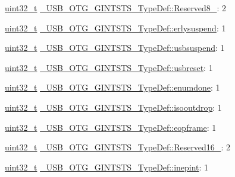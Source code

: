 \begin{DoxyCompactItemize}
\item 
\hyperlink{stdint_8h_a435d1572bf3f880d55459d9805097f62}{uint32\-\_\-t} \hyperlink{group___u_s_b___o_t_g___d_r_i_v_e_r_gac282811c049c2f0186941c0813ffb4bb}{\-\_\-\-U\-S\-B\-\_\-\-O\-T\-G\-\_\-\-G\-I\-N\-T\-S\-T\-S\-\_\-\-Type\-Def\-::\-Reserved8\-\_}\-: 2
\item 
\hyperlink{stdint_8h_a435d1572bf3f880d55459d9805097f62}{uint32\-\_\-t} \hyperlink{group___u_s_b___o_t_g___d_r_i_v_e_r_gaa2d6edb7543a04dc301dfe99d40fdaa0}{\-\_\-\-U\-S\-B\-\_\-\-O\-T\-G\-\_\-\-G\-I\-N\-T\-S\-T\-S\-\_\-\-Type\-Def\-::erlysuspend}\-: 1
\item 
\hyperlink{stdint_8h_a435d1572bf3f880d55459d9805097f62}{uint32\-\_\-t} \hyperlink{group___u_s_b___o_t_g___d_r_i_v_e_r_gaa87e3d039cbe1bef55795ef737c3069d}{\-\_\-\-U\-S\-B\-\_\-\-O\-T\-G\-\_\-\-G\-I\-N\-T\-S\-T\-S\-\_\-\-Type\-Def\-::usbsuspend}\-: 1
\item 
\hyperlink{stdint_8h_a435d1572bf3f880d55459d9805097f62}{uint32\-\_\-t} \hyperlink{group___u_s_b___o_t_g___d_r_i_v_e_r_ga3aa72a4a2817c4f18026664ecc761887}{\-\_\-\-U\-S\-B\-\_\-\-O\-T\-G\-\_\-\-G\-I\-N\-T\-S\-T\-S\-\_\-\-Type\-Def\-::usbreset}\-: 1
\item 
\hyperlink{stdint_8h_a435d1572bf3f880d55459d9805097f62}{uint32\-\_\-t} \hyperlink{group___u_s_b___o_t_g___d_r_i_v_e_r_gaab39d5018e7840be12a735b020a24c39}{\-\_\-\-U\-S\-B\-\_\-\-O\-T\-G\-\_\-\-G\-I\-N\-T\-S\-T\-S\-\_\-\-Type\-Def\-::enumdone}\-: 1
\item 
\hyperlink{stdint_8h_a435d1572bf3f880d55459d9805097f62}{uint32\-\_\-t} \hyperlink{group___u_s_b___o_t_g___d_r_i_v_e_r_ga3bff231b75a5c9d6da76f7f5188bf655}{\-\_\-\-U\-S\-B\-\_\-\-O\-T\-G\-\_\-\-G\-I\-N\-T\-S\-T\-S\-\_\-\-Type\-Def\-::isooutdrop}\-: 1
\item 
\hyperlink{stdint_8h_a435d1572bf3f880d55459d9805097f62}{uint32\-\_\-t} \hyperlink{group___u_s_b___o_t_g___d_r_i_v_e_r_gac1b2cf4a638d9c0eb0c5b07e689bb8fd}{\-\_\-\-U\-S\-B\-\_\-\-O\-T\-G\-\_\-\-G\-I\-N\-T\-S\-T\-S\-\_\-\-Type\-Def\-::eopframe}\-: 1
\item 
\hyperlink{stdint_8h_a435d1572bf3f880d55459d9805097f62}{uint32\-\_\-t} \hyperlink{group___u_s_b___o_t_g___d_r_i_v_e_r_ga36610b1155d4d97c36cbc61cd737c240}{\-\_\-\-U\-S\-B\-\_\-\-O\-T\-G\-\_\-\-G\-I\-N\-T\-S\-T\-S\-\_\-\-Type\-Def\-::\-Reserved16\-\_}\-: 2
\item 
\hyperlink{stdint_8h_a435d1572bf3f880d55459d9805097f62}{uint32\-\_\-t} \hyperlink{group___u_s_b___o_t_g___d_r_i_v_e_r_ga873a965f92861c5ce2abcfd007a8770b}{\-\_\-\-U\-S\-B\-\_\-\-O\-T\-G\-\_\-\-G\-I\-N\-T\-S\-T\-S\-\_\-\-Type\-Def\-::inepint}\-: 1

\end{DoxyCompactItemize}
